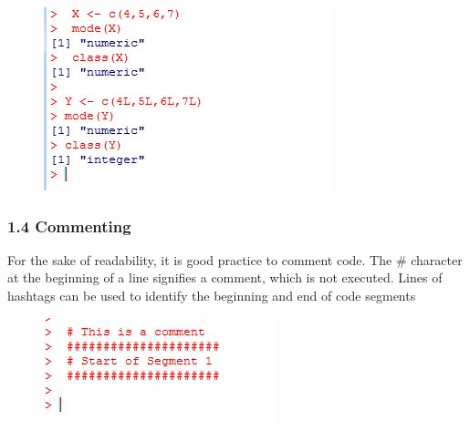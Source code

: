 \documentclass{beamer}
\begin{document}
 	\begin{frame}
 		\begin{figure}
 			\centering
 			\includegraphics[width=1.2\linewidth]{images/numerictypes}    
 		\end{figure}
 	\end{frame}   
 	\begin{frame}
 		\frametitle{1.4 Commenting}
 		For the sake of readability, it is good practice to comment code. The \# character at the
 		beginning of a line signifies a comment, which is not executed. Lines of hashtags can be used
 		to identify the beginning and end of code segments
 		\begin{figure}
 			\centering
 			\includegraphics[width=1.2\linewidth]{images/commenting}
 		\end{figure}
 		
 	\end{frame}
\end{document}
